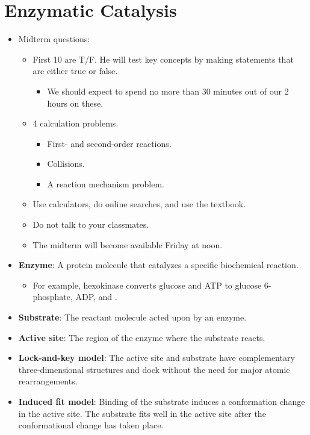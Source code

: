 \documentclass[../notes.tex]{subfiles}
\begin{document}
\section{Enzymatic Catalysis}
\begin{itemize}
    \item {}Midterm questions:
    \begin{itemize}
        \item First 10 are T/F. He will test key concepts by making statements that are either true or false.
        \begin{itemize}
            \item We should expect to spend no more than 30 minutes out of our 2 hours on these.
        \end{itemize}
        \item 4 calculation problems.
        \begin{itemize}
            \item First- and second-order reactions.
            \item Collisions.
            \item A reaction mechanism problem.
        \end{itemize}
        \item Use calculators, do online searches, and use the textbook.
        \item Do not talk to your classmates.
        \item The midterm will become available Friday at noon.
    \end{itemize}
    \item \textbf{Enzyme}: A protein molecule that catalyzes a specific biochemical reaction.
    \begin{itemize}
        \item For example, hexokinase converts glucose and ATP to glucose 6-phosphate, ADP, and .
    \end{itemize}
    \item \textbf{Substrate}: The reactant molecule acted upon by an enzyme.
    \item \textbf{Active site}: The region of the enzyme where the substrate reacts.
    \item \textbf{Lock-and-key model}: The active site and substrate have complementary three-dimensional structures and dock without the need for major atomic rearrangements.
    \item \textbf{Induced fit model}: Binding of the substrate induces a conformation change in the active site. The substrate fits well in the active site after the conformational change has taken place.

\end{itemize}
\end{document}
